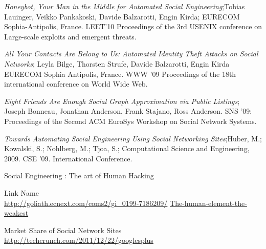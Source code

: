 \begin{thebibliography}{99}



\emph{Honeybot, Your Man in the Middle for Automated Social Engineering};Tobias Lauinger, Veikko Pankakoski, Davide Balzarotti, Engin Kirda; EURECOM Sophia-Antipolis, France. LEET’10 Proceedings of the 3rd USENIX conference on Large-scale exploits and emergent threats.

\emph{All Your Contacts Are Belong to Us: Automated Identity Theft Attacks on Social Networks}; Leyla Bilge, Thorsten Strufe, Davide Balzarotti, Engin Kirda EURECOM Sophia Antipolis, France. WWW ’09 Proceedings of the 18th international conference on World Wide Web.

\emph{Eight Friends Are Enough Social Graph Approximation via Public Listings}; Joseph Bonneau, Jonathan Anderson, Frank Stajano, Ross Anderson. SNS ’09: Proceedings of the Second ACM EuroSys Workshop on Social Network Systems.

\emph{Towards Automating Social Engineering Using Social Networking Sites};Huber, M.; Kowalski, S.; Nohlberg, M.; Tjoa, S.; Computational Science and Engineering, 2009. CSE ’09. International Conference.

Social Engineering : The art of Human Hacking


Link Name \\ \url{http://goliath.ecnext.com/coms2/gi_0199-7186209/}
\url{The-human-element-the-weakest}


Market Share of Social Network Sites \\ \url{http://techcrunch.com/2011/12/22/googlesplus}








\end{thebibliography}